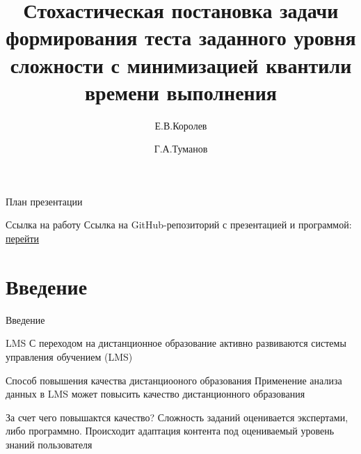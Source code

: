 \documentclass[aspectratio=169]{beamer}
\title[Стохасти- ческая задача формирования теста]{Стохастическая постановка задачи формирования теста заданного уровня сложности с минимизацией квантили времени выполнения}
\author[Королев Егор \and Туманов Георгий]{Е.В.Королев \and Г.А.Туманов}
\institute[НИУ МАИ]{Московский авиационный институт (НИУ)}
\begin{document}
    \begin{frame}
        \maketitle
    \end{frame}

    \begin{frame}{План презентации}
        \tableofcontents
    \end{frame}

    \begin{frame}{Ссылка на работу}
        Ссылка на GitHub-репозиторий с презентацией и программой:  \href{https://github.com/KorolevEgor/Linear-Stochastic-Programming-course}{перейти}
    \end{frame}

    \section{Введение}
    \begin{frame}{Введение}
        \begin{block}{LMS}
            С переходом на дистанционное образование активно развиваются системы управления обучением (LMS)\\
        \end{block}
    
        \begin{block}{Способ повышения качества дистанциооного образования}
            Применение анализа данных в LMS может повысить качество дистанционного образования\\
        \end{block}
    
        \begin{block}{За счет чего повышактся качество?}
            Сложность заданий оценивается экспертами, либо программно. Происходит адаптация контента под оцениваемый уровень знаний пользователя\\
        \end{block}
    \end{frame}
\end{document}
